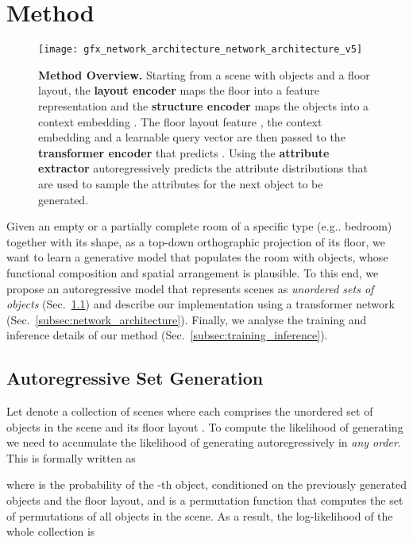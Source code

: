 \documentclass{article}
\makeatletter
\DeclareRobustCommand\onedot{\futurelet\@let@token\@onedot}
\def\@onedot{\ifx\@let@token.\else.\null\fi\xspace}
\def\eg{e.g\onedot} \def\Eg{E.g\onedot}
\newcommand{\secref}[1]{Sec.~\ref{#1}}
\makeatother
\begin{document}
\section{Method}
\label{sec:method}

\begin{figure*}
\vspace{-2mm}
    \centering
    \texttt{[image: gfx\_network\_architecture\_network\_architecture\_v5]}
    \caption{\small 
        {\bf{Method Overview.}} Starting from a scene with
         objects and a floor layout, the
        \textbf{layout encoder} maps the floor into a feature representation  and
        the \textbf{structure encoder} maps the objects into a
        context embedding . The floor
        layout feature , the context embedding  and a learnable
        query vector  are then passed to the \textbf{transformer
        encoder} that predicts . Using  the \textbf{attribute
        extractor} autoregressively predicts the attribute distributions that are used
        to sample the attributes for the next object to be generated.
        }
    \label{fig:method_overview}
    \vspace{-1.2em}
\end{figure*}

Given an empty or a partially complete room of a specific type (\eg bedroom)
together with its shape, as a top-down orthographic projection of its
floor, we want to learn a generative model that populates the room with objects,
whose functional composition and spatial arrangement is plausible. To this end,
we propose an autoregressive model that represents scenes as \emph{unordered
sets of objects} (\secref{subsec:set_gen}) and describe our implementation using a
transformer network (\secref{subsec:network_architecture}). Finally, we analyse
the training and inference details of our method (\secref{subsec:training_inference}).

\vspace{-2mm}
\subsection{Autoregressive Set Generation}\label{subsec:set_gen}
Let  denote a collection of scenes where each
 comprises the unordered set of objects in the
scene  and its floor layout . To compute the
likelihood of generating  we need to accumulate the likelihood of
generating  autoregressively in \emph{any order}. This is
formally written as

where  is the probability of the -th
object, conditioned on the previously generated objects and the floor layout,
and  is a permutation function that computes the set of
permutations of all objects in the scene. As a result, the log-likelihood of
the whole collection  is
\end{document}

